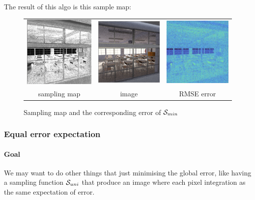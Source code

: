 \documentclass{classeENS}
\begin{document}
The result of this algo is this sample map:
\begin{figure}[H]
    \centering
    \caption{Sampling map and the corresponding error of $\mathcal S_{min}$}
    \begin{tabular}{ccc}
    \includegraphics[width=45mm]{image/without/sm_min.png}
    & \includegraphics[width=45mm]{image/without/normal_min.png}
    & \includegraphics[width=45mm]{image/without/RMSE_min.png} \\
    sampling map & image & RMSE error
    \end{tabular}
\end{figure}

\subsubsection{Equal error expectation}

\paragraph*{Goal} We may want to do other things that just minimising the global error, 
like having a sampling function $\mathcal S_{uni}$ 
that produce an image where each pixel integration as the same expectation of error. 
\end{document}
